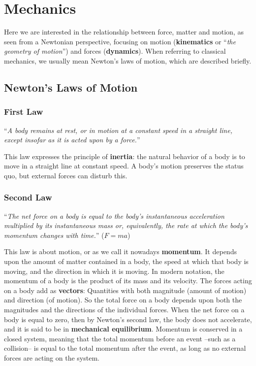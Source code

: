 \section{Mechanics}\label{sec:mechanics}

Here we are interested in the relationship between force, matter and motion, as seen from a Newtonian perspective, focusing on motion (\textbf{kinematics} or ``\textit{the geometry of motion}'') and forces (\textbf{dynamics}).
When referring to classical mechanics, we usually mean Newton's laws of motion, which are described briefly.

\subsection{Newton's Laws of Motion}\label{subsec:laws-of-motion}

\subsubsection{First Law}

``\textit{A body remains at rest, or in motion at a constant speed in a straight line, except insofar as it is acted upon by a force.}''

This law expresses the principle of \textbf{\gls{inertia}}: the natural behavior of a body is to move in a straight line at constant speed.
A body's motion preserves the status quo, but external forces can disturb this.

\subsubsection{Second Law}

``\textit{The net force on a body is equal to the body's instantaneous acceleration multiplied by its instantaneous mass or, equivalently, the rate at which the body's momentum changes with time.}'' ($F = ma$)

This law is about motion, or as we call it nowadays \textbf{\gls{momentum}}.
It depends upon the amount of matter contained in a body, the speed at which that body is moving, and the direction in which it is moving.
In modern notation, the momentum of a body is the product of its mass and its velocity.
The forces acting on a body add as \textbf{\gls{vector}s}: Quantities with both magnitude (amount of motion) and direction (of motion).
So the total force on a body depends upon both the magnitudes and the directions of the individual forces.
When the net force on a body is equal to zero, then by Newton's second law, the body does not accelerate, and it is said to be in \textbf{mechanical equilibrium}.
Momentum is conserved in a closed system, meaning that the total momentum before an event --such as a collision-- is equal to the total momentum after the event, as long as no external forces are acting on the system.

